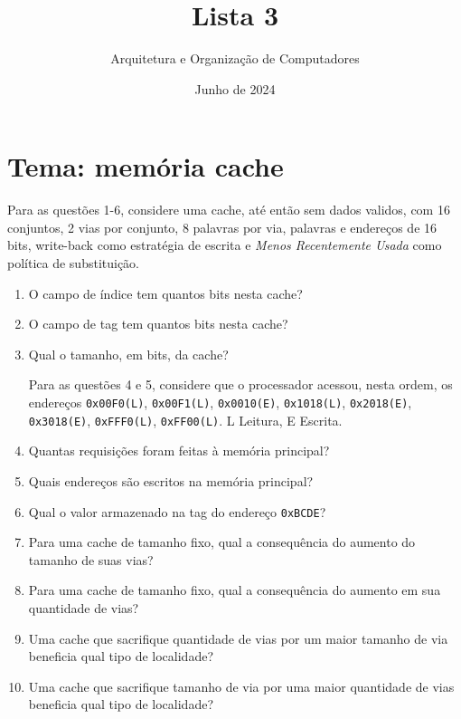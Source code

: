 \documentclass{article}
\title{\Huge Lista 3}
\author{\Large Arquitetura e Organização de Computadores}
\date{Junho de 2024}
\begin{document}
\large

\maketitle

\section*{Tema: memória cache}

Para as questões 1-6, considere uma cache, até então sem dados validos, com 16 conjuntos, 2 vias por conjunto, 8 palavras por via, palavras e endereços de 16 bits, write-back como estratégia de escrita e \textit{Menos Recentemente Usada} como política de substituição.

\begin{enumerate}

\item O campo de índice tem quantos bits nesta cache?

\item O campo de tag tem quantos bits nesta cache?

\item Qual o tamanho, em bits, da cache?

Para as questões 4 e 5, considere que o processador acessou, nesta ordem, os endereços \verb|0x00F0(L)|, \verb|0x00F1(L)|, \verb|0x0010(E)|, \verb|0x1018(L)|, \verb|0x2018(E)|, \verb|0x3018(E)|, \verb|0xFFF0(L)|, \verb|0xFF00(L)|. L \textrightarrow Leitura, E \textrightarrow Escrita.

\item Quantas requisições foram feitas à memória principal?

\item Quais endereços são escritos na memória principal?

\item Qual o valor armazenado na tag do endereço \verb|0xBCDE|?

\item Para uma cache de tamanho fixo, qual a consequência do aumento do tamanho de suas vias?

\item Para uma cache de tamanho fixo, qual a consequência do aumento em sua quantidade de vias?

\item Uma cache que sacrifique quantidade de vias por um maior tamanho de via beneficia qual tipo de localidade?

\item Uma cache que sacrifique tamanho de via por uma maior quantidade de vias beneficia qual tipo de localidade?


\end{enumerate}
\end{document}
